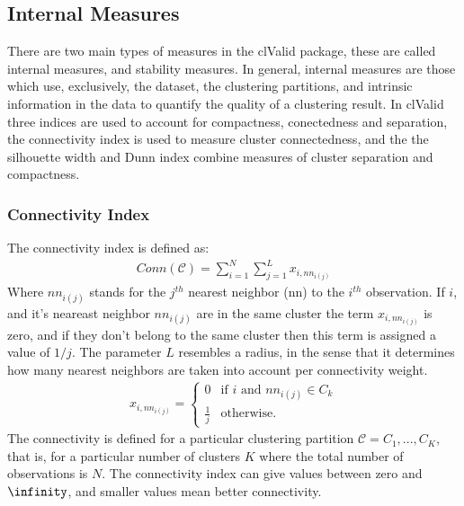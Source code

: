 \subsection{Internal Measures}
There are two main types of measures in the clValid package, these are
called internal measures, and stability measures. In general, internal
measures are those which use, exclusively, the dataset, the clustering
partitions,  and intrinsic  information in  the data  to  quantify the
quality of a  clustering result. In clValid three  indices are used to
account for compactness, conectedness and separation, the connectivity
index is used to measure cluster connectedness, and the the silhouette
width  and  Dunn index  combine  measures  of  cluster separation  and
compactness.

\subsubsection{Connectivity Index}
The connectivity index is defined as:
\begin{gather}
Conn(\mathcal{C}) = \sum_{i=1}^{N}\sum_{j=1}^{L} x_{i,nn_{i(j)}}
\end{gather}
Where $nn_{i(j)}$ stands for the $j^{th}$ nearest neighbor (nn) to the
$i^{th}$ observation.  If $i$,  and it's neareast neighbor $nn_{i(j)}$
are in  the same  cluster the term  $x_{i,nn_{i(j)}}$ is zero,  and if
they don't  belong to the  same cluster then  this term is  assigned a
value of $1/j$.  The parameter $L$ resembles a radius, in
the sense that it determines how many nearest neighbors are taken into
account per connectivity weight.
\begin{gather}
x_{i,nn_{i(j)}} =
    \begin{cases}
      0           &  \text{if } i \text{ and } nn_{i(j)} \in C_{k} \\
      \frac{1}{j} &  \text{otherwise.}
    \end{cases}
\end{gather}  
The  connectivity is  defined  for a  particular clustering  partition
$\mathcal{C} =  {C_{1},..., C_{K}}$, that is, for  a particular number
of clusters $K$ where the total number of observations is $N$. 
The connectivity index can give values between zero and $\infinity$,
and smaller values mean better connectivity.

